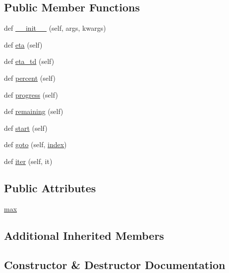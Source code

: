 \subsection*{Public Member Functions}
\begin{DoxyCompactItemize}
\item 
def \hyperlink{classpip_1_1__vendor_1_1progress_1_1Progress_a4933afb992fe226e564f6f4218074db6}{\+\_\+\+\_\+init\+\_\+\+\_\+} (self, args, kwargs)
\item 
def \hyperlink{classpip_1_1__vendor_1_1progress_1_1Progress_afb282d3471f211414322a614d7d0150d}{eta} (self)
\item 
def \hyperlink{classpip_1_1__vendor_1_1progress_1_1Progress_a6a8a441867d2d6f81a59169bfea11593}{eta\+\_\+td} (self)
\item 
def \hyperlink{classpip_1_1__vendor_1_1progress_1_1Progress_aace683da8d30dcc5af701ff614c2e77b}{percent} (self)
\item 
def \hyperlink{classpip_1_1__vendor_1_1progress_1_1Progress_a4b4a357ec2eb0c869ff2c5fddda20da1}{progress} (self)
\item 
def \hyperlink{classpip_1_1__vendor_1_1progress_1_1Progress_afce9264c30f2d0bba357c483f27db20b}{remaining} (self)
\item 
def \hyperlink{classpip_1_1__vendor_1_1progress_1_1Progress_a51d126b2307c5d869e931b807f28d488}{start} (self)
\item 
def \hyperlink{classpip_1_1__vendor_1_1progress_1_1Progress_af7e944763f362b2f709502ce97988f8f}{goto} (self, \hyperlink{classpip_1_1__vendor_1_1progress_1_1Infinite_ac93e2c5c93be9e29672ff742b5a5e7bc}{index})
\item 
def \hyperlink{classpip_1_1__vendor_1_1progress_1_1Progress_af58dae555a18100e56380fb679c15eb7}{iter} (self, it)
\end{DoxyCompactItemize}
\subsection*{Public Attributes}
\begin{DoxyCompactItemize}
\item 
\hyperlink{classpip_1_1__vendor_1_1progress_1_1Progress_ae26e5c93bb50b02076a588cb26465c1c}{max}
\end{DoxyCompactItemize}
\subsection*{Additional Inherited Members}


\subsection{Constructor \& Destructor Documentation}
\mbox{\label{classpip_1_1__vendor_1_1progress_1_1Progress_a4933afb992fe226e564f6f4218074db6}} 
